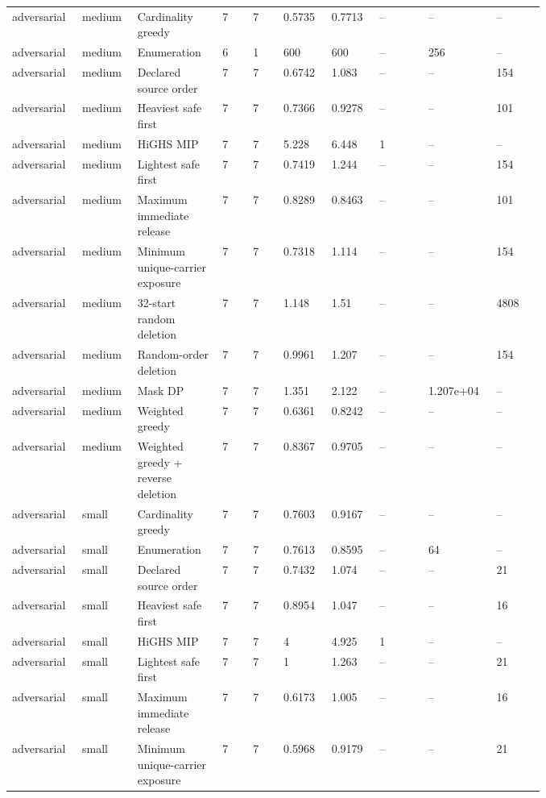 {\begin{longtable}{p{0.07\linewidth}p{0.06\linewidth}p{0.13\linewidth}p{0.055\linewidth}p{0.055\linewidth}p{0.075\linewidth}p{0.075\linewidth}p{0.085\linewidth}p{0.085\linewidth}p{0.085\linewidth}}
adversarial & medium & Cardinality greedy & 7 & 7 & 0.5735 & 0.7713 & -- & -- & -- \\
adversarial & medium & Enumeration & 6 & 1 & 600 & 600 & -- & 256 & -- \\
adversarial & medium & Declared source order & 7 & 7 & 0.6742 & 1.083 & -- & -- & 154 \\
adversarial & medium & Heaviest safe first & 7 & 7 & 0.7366 & 0.9278 & -- & -- & 101 \\
adversarial & medium & HiGHS MIP & 7 & 7 & 5.228 & 6.448 & 1 & -- & -- \\
adversarial & medium & Lightest safe first & 7 & 7 & 0.7419 & 1.244 & -- & -- & 154 \\
adversarial & medium & Maximum immediate release & 7 & 7 & 0.8289 & 0.8463 & -- & -- & 101 \\
adversarial & medium & Minimum unique-carrier exposure & 7 & 7 & 0.7318 & 1.114 & -- & -- & 154 \\
adversarial & medium & 32-start random deletion & 7 & 7 & 1.148 & 1.51 & -- & -- & 4808 \\
adversarial & medium & Random-order deletion & 7 & 7 & 0.9961 & 1.207 & -- & -- & 154 \\
adversarial & medium & Mask DP & 7 & 7 & 1.351 & 2.122 & -- & 1.207e+04 & -- \\
adversarial & medium & Weighted greedy & 7 & 7 & 0.6361 & 0.8242 & -- & -- & -- \\
adversarial & medium & Weighted greedy + reverse deletion & 7 & 7 & 0.8367 & 0.9705 & -- & -- & -- \\
adversarial & small & Cardinality greedy & 7 & 7 & 0.7603 & 0.9167 & -- & -- & -- \\
adversarial & small & Enumeration & 7 & 7 & 0.7613 & 0.8595 & -- & 64 & -- \\
adversarial & small & Declared source order & 7 & 7 & 0.7432 & 1.074 & -- & -- & 21 \\
adversarial & small & Heaviest safe first & 7 & 7 & 0.8954 & 1.047 & -- & -- & 16 \\
adversarial & small & HiGHS MIP & 7 & 7 & 4 & 4.925 & 1 & -- & -- \\
adversarial & small & Lightest safe first & 7 & 7 & 1 & 1.263 & -- & -- & 21 \\
adversarial & small & Maximum immediate release & 7 & 7 & 0.6173 & 1.005 & -- & -- & 16 \\
adversarial & small & Minimum unique-carrier exposure & 7 & 7 & 0.5968 & 0.9179 & -- & -- & 21 \\

\end{longtable}}
